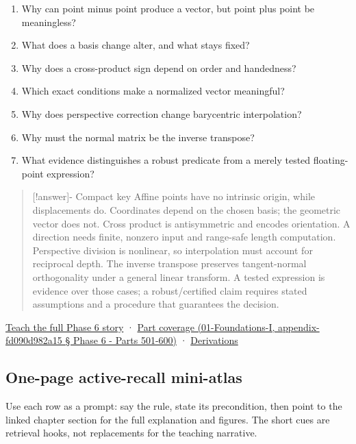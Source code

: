 \begin{enumerate}
\def\labelenumi{\arabic{enumi}.}
\tightlist
\item
  Why can point minus point produce a vector, but point plus point be meaningless?
\item
  What does a basis change alter, and what stays fixed?
\item
  Why does a cross-product sign depend on order and handedness?
\item
  Which exact conditions make a normalized vector meaningful?
\item
  Why does perspective correction change barycentric interpolation?
\item
  Why must the normal matrix be the inverse transpose?
\item
  What evidence distinguishes a robust predicate from a merely tested floating-point expression?
\end{enumerate}

\begin{quote}
{[}!answer{]}- Compact key Affine points have no intrinsic origin, while displacements do. Coordinates depend on the chosen basis; the geometric vector does not. Cross product is antisymmetric and encodes orientation. A direction needs finite, nonzero input and range-safe length computation. Perspective division is nonlinear, so interpolation must account for reciprocal depth. The inverse transpose preserves tangent-normal orthogonality under a general linear transform. A tested expression is evidence over those cases; a robust/certified claim requires stated assumptions and a procedure that guarantees the decision.
\end{quote}

\href{Continuous\%20Notes/Computing\%20Foundations\%20-\%20From\%20Bits\%20to\%20C++\%20and\%20Systems\%20APIs\#The\%20panel\%20gives\%20us\%20a\%20reason\%20to\%20learn}{Teach the full Phase 6 story} · \href{}{Part coverage (01-Foundations-I, appendix-fd090d982a15 § Phase 6 - Parts 501-600)} · \href{Continuous\%20Notes/Computing\%20Foundations\%20-\%20From\%20Bits\%20to\%20C++\%20and\%20Systems\%20APIs\#Phase\%206\%20-\%20Geometry\%20reconstruction\%20proofs}{Derivations}

\subsection{One-page active-recall mini-atlas}\label{one-page-active-recall-mini-atlas}

Use each row as a prompt: say the rule, state its precondition, then point to the linked chapter section for the full explanation and figures. The short cues are retrieval hooks, not replacements for the teaching narrative.

